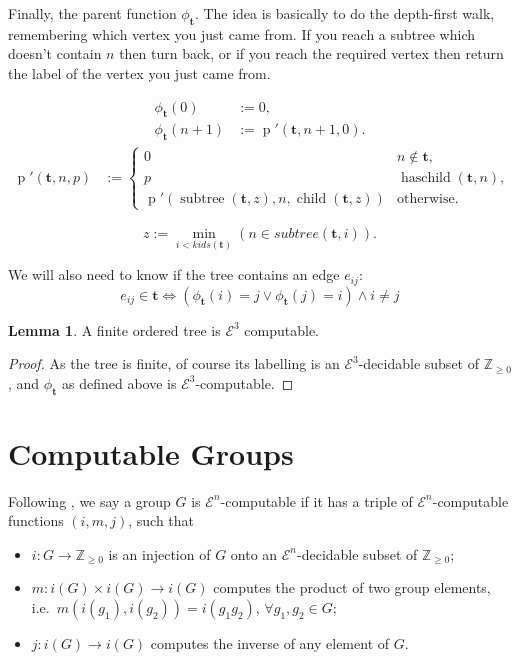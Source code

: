 \documentclass[a4paper]{article}
\newcommand{\grz}[1]{$\mathcal{E}^{#1}$}	%
\newcommand{\ZZ}{\mathbb{Z}}
\newcommand{\tvec}{\mathbf{t}}	%
\newcommand{\recur}[1]{\begin{equation} \begin{split} #1 \end{split} \end{equation}}	%
\newcommand{\recurN}[1]{\begin{equation*} \begin{split} #1 \end{split} \end{equation*}}	%
\theoremstyle{plain}
\theoremstyle{definition}
\newtheorem{lemma}[theorem]{Lemma}
\begin{document}
Finally, the parent function $\phi_{\tvec}$. The idea is basically to do the depth-first walk, remembering which vertex you just came from. If you reach a subtree which doesn't contain $n$ then turn back, or if you reach the required vertex then return the label of the vertex you just came from.

\recur{
\phi_{\tvec}(0) &:= 0, \\
\phi_{\tvec}(n+1) &:= \operatorname{p}'(\tvec,n+1,0).
}
\recurN{
\operatorname{p}'(\tvec,n,p) &:= \begin{cases}
						0 & n \not \in \tvec, \\
						p & \operatorname{haschild}(\tvec,n), \\
						\operatorname{p}'(\operatorname{subtree}(\tvec,z),n,\operatorname{child}(\tvec,z)) & \textrm{otherwise.}
					\end{cases}
}

\begin{equation*} z := \min_{i < kids(\tvec)}(n \in subtree(\tvec,i)). \end{equation*}

We will also need to know if the tree contains an edge $e_{ij}$:
\begin{equation} e_{ij} \in \tvec \Leftrightarrow \left ( \phi_{\tvec}(i) = j \vee \phi_{\tvec}(j) = i \right ) \wedge i \neq j \end{equation}


\begin{lemma}
A finite ordered tree is \grz{3} computable.
\end{lemma}

\begin{proof}
	As the tree is finite, of course its labelling is an \grz{3}-decidable subset of $\ZZ_{\geq 0}$, and $\phi_{\tvec}$ as defined above is \grz{3}-computable.
\end{proof}

\section{Computable Groups \label{groups}}

Following \cite{Cannonito_1966}, we say a group $G$ is \grz{n}-computable if it has a triple of \grz{n}-computable functions $(i,m,j)$, such that

\begin{itemize}
	\item $i: G \rightarrow \ZZ_{\geq 0}$ is an injection of $G$ onto an \grz{n}-decidable subset of $\ZZ_{\geq 0}$;
	\item $m: i(G) \times i(G) \rightarrow i(G)$ computes the product of two group elements, i.e.\ $m \left(i(g_1),i(g_2)\right) = i(g_1g_2)$, $\forall g_1,g_2 \in G$;
	\item $j: i(G) \rightarrow i(G)$ computes the inverse of any element of $G$.
\end{itemize}
\end{document}
